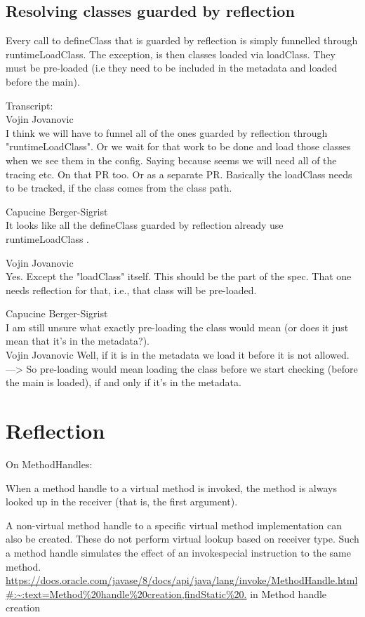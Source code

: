 \subsection{Resolving classes guarded by reflection}
Every call to defineClass that is guarded by reflection is simply funnelled through runtimeLoadClass.
The exception, is then classes loaded via loadClass. They must be pre-loaded (i.e they need to be included in the metadata and loaded before the main).

Transcript:\\
Vojin Jovanovic\\
I think we will have to funnel all of the ones guarded by reflection through "runtimeLoadClass".
Or we wait for that work to be done and load those classes when we see them in the config.
Saying because seems we will need all of the tracing etc. On that PR too.
Or as a separate PR.
Basically the loadClass needs to be tracked, if the class comes from the class path.

Capucine Berger-Sigrist\\
It looks like all the defineClass guarded by reflection already use runtimeLoadClass .

Vojin Jovanovic\\
Yes. Except the "loadClass" itself.
This should be the part of the spec.
That one needs reflection for that, i.e., that class will be pre-loaded.

Capucine Berger-Sigrist\\
I am still unsure what exactly pre-loading the class would mean (or does it just mean that it's in the metadata?).\\

Vojin Jovanovic
Well, if it is in the metadata we load it before it is not allowed.
---> So pre-loading would mean loading the class before we start checking (before the main is loaded), if and only if it's in the metadata.
 
\section{Reflection}
On MethodHandles:

When a method handle to a virtual method is invoked, the method is always looked up in the receiver (that is, the first argument).

A non-virtual method handle to a specific virtual method implementation can also be created. These do not perform virtual lookup based on receiver type. Such a method handle simulates the effect of an invokespecial instruction to the same method.
\url{https://docs.oracle.com/javase/8/docs/api/java/lang/invoke/MethodHandle.html#:~:text=Method%20handle%20creation,findStatic%20.} in Method handle creation

